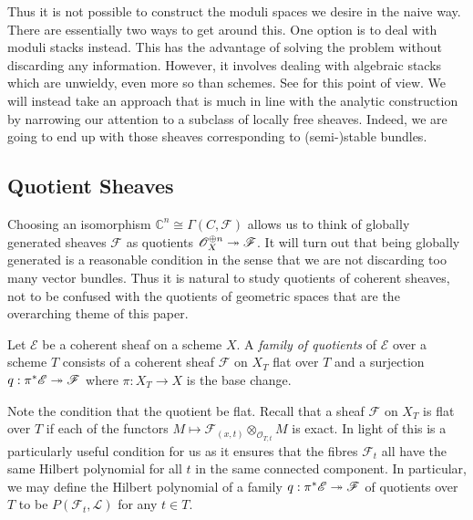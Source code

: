 \documentclass[12pt]{ociamthesis}  %
\begin{document}
Thus it is not possible to construct the moduli spaces we desire
in the naive way. There are essentially two ways to get around this.
One option is to deal with
moduli stacks instead. This has the advantage of solving the problem
without discarding any information. However, it involves dealing with
algebraic stacks which are unwieldy, even more so than schemes.
See \cite{cm2017} for this point of view. We will instead take an
approach that is much in line with the analytic construction by narrowing
our attention to a subclass of locally free sheaves. Indeed, we are
going to end up with those sheaves corresponding to (semi-)stable
bundles.

\subsection{Quotient Sheaves} 

Choosing an isomorphism $\mathbb C^n \cong \Gamma(C,\mathscr F)$
allows us to think of globally generated sheaves $\mathscr F$
as quotients $\mathscr O_X^{\oplus n} \twoheadrightarrow \mathscr F$.
It will turn out that being globally generated is a reasonable
condition in the sense that we are not discarding too many
vector bundles. Thus it is natural to study quotients of coherent sheaves,
not to be confused with the quotients of geometric spaces that
are the overarching theme of this paper.

\begin{definition}
  Let $\mathscr E$ be a coherent sheaf on a scheme $X$.
  A \emph{family of quotients} of $\mathscr E$ over a scheme $T$
  consists of a coherent sheaf $\mathscr F$ on $X_T$ flat over $T$ and a
  surjection $q:\pi^*\mathscr E\twoheadrightarrow\mathscr F$ where
  $\pi : X_T \to X$ is the base change.
\end{definition}

Note the condition that the quotient be flat. Recall that a sheaf
$\mathscr F$ on $X_T$ is flat over $T$ if each of the functors
$M \mapsto \mathscr F_{(x,t)} \otimes_{\mathscr O_{T,t}} M$ is exact.
In light of \cite[III Theorem 9.9]{hartshorne1977} this is a
particularly useful condition for us as it ensures that the fibres
$\mathscr F_t$ all have the same Hilbert polynomial
for all $t$ in the same connected component. In particular,
we may define the Hilbert polynomial of a family
$q : \pi^*\mathscr E \twoheadrightarrow \mathscr F$ of quotients over $T$ to be
$P(\mathscr F_t,\mathscr L)$ for any $t\in T$.
\end{document}
